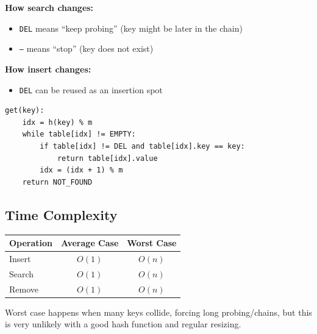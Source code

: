 \textbf{How search changes:}
\begin{itemize}
  \item \texttt{DEL} means ``keep probing'' (key might be later in the chain)
  \item \texttt{--} means ``stop'' (key does not exist)
\end{itemize}

\textbf{How insert changes:}
\begin{itemize}
  \item \texttt{DEL} can be reused as an insertion spot
\end{itemize}

\begin{verbatim}
get(key):
    idx = h(key) % m
    while table[idx] != EMPTY:
        if table[idx] != DEL and table[idx].key == key:
            return table[idx].value
        idx = (idx + 1) % m
    return NOT_FOUND
\end{verbatim}

\subsection{Time Complexity}

\begin{center}
\begin{tabular}{l c c}
\toprule
\textbf{Operation} & \textbf{Average Case} & \textbf{Worst Case} \\
\midrule
Insert & $O(1)$ & $O(n)$ \\
Search & $O(1)$ & $O(n)$ \\
Remove & $O(1)$ & $O(n)$ \\
\bottomrule
\end{tabular}
\end{center}

Worst case happens when many keys collide, forcing long probing/chains, but this is very unlikely with a good hash function and regular resizing.
